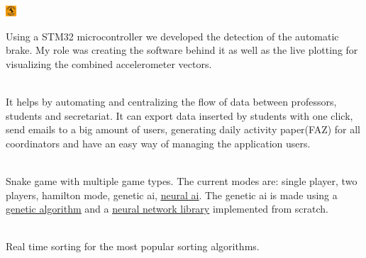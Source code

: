 \documentclass[a4paper]{MagicalCV}
\begin{document}
\begin{minipage}[t]{0.59\textwidth}
\includegraphics[height=4mm]{continental.png}
 \\
\vspace{\topsep} %
\begin{tightemize}
    \item \justify Using a STM32 microcontroller we developed the detection of the automatic brake. My role was
          creating the software behind it as well as the live plotting for visualizing the combined accelerometer vectors.
\end{tightemize}
\sectionsep


 \\
It helps by automating and centralizing the flow of data between professors, students and secretariat. It can export data inserted by students with one click, send emails to a big amount of users, generating daily activity paper(FAZ) for all coordinators and have an easy way of managing the application users.
\sectionsep

 \\
Snake game with multiple game types. The current modes are: single player,
two players, hamilton mode, genetic ai, \href{https://github.com/valentin-stamate/Neural-Network-Project}{\underline{neural ai}}. The genetic ai is
made using a \href{https://github.com/valentin-stamate/Genetic-Algorithms-Playground}{\underline{genetic algorithm}} and a \href{https://github.com/valentin-stamate/Neural-Networks-Playground}{\underline{neural network library}} implemented from scratch.
\sectionsep

 \\
Real time sorting for the most popular sorting algorithms.
\sectionsep

\end{minipage} 
\end{document}
